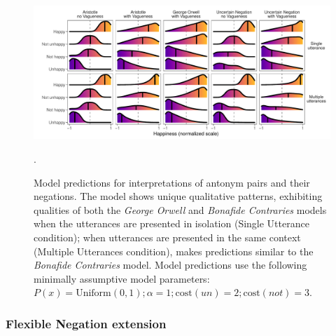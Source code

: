 \documentclass[floatsintext,doc]{apa6}
\begin{document}




\begin{figure}[t]
\centering \includegraphics{figs/alternativeModels_all5_fine_dists.pdf} 
\caption{Model predictions for interpretations of antonym pairs and their negations. The \emph{\ourmodel} model shows unique qualitative patterns, exhibiting qualities of both the \emph{George Orwell} and \emph{Bonafide Contraries} models when the utterances are presented in isolation (Single Utterance condition); when utterances are presented in the same context (Multiple Utterances condition), \emph{\ourmodel} makes predictions similar to the \emph{Bonafide Contraries} model. Model predictions use the following minimally assumptive model parameters: $P(x) = \text{Uniform}(0, 1); \alpha = 1; \text{cost}(\mathit{un}) = 2; \text{cost}(\mathit{not}) = 3$.}.\label{fig:modelPredictions}
\end{figure}
\newpage



\subsubsection{Flexible Negation extension}
\end{document}
